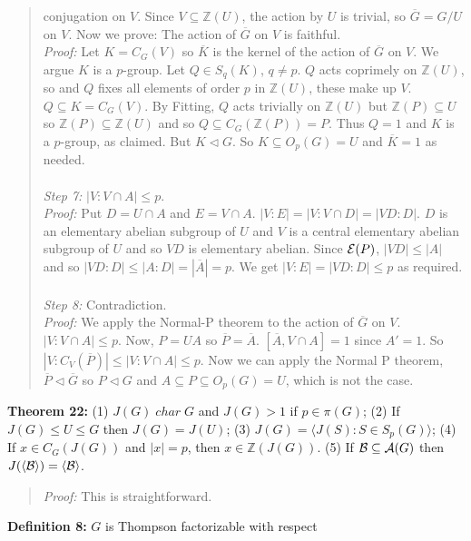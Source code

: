 \begin{quote}
conjugation on $V$.  Since $V \subseteq {\mathbb Z} (U)$, the action by $U$ is trivial, so ${\overline G} = G/U$ on $V$.
Now we prove:
The action of ${\overline G}$ on $V$ is faithful. \\
\emph{Proof:}  
Let $K = C_G(V)$ so ${\overline K}$ is the kernel of the action of ${\overline G}$ on $V$.
We argue $K$ is a $p$-group.
Let $Q \in S_q(K)$, $q \ne p$.  $Q$ acts coprimely on ${\mathbb Z}(U)$, so
and $Q$ fixes all elements of order $p$ in ${\mathbb Z}(U)$, these make up $V$. 
$Q \subseteq K =C_G(V)$.   By Fitting, $Q$ acts trivially on ${\mathbb Z}(U)$ but
${\mathbb Z}(P) \subseteq U$ so ${\mathbb Z}(P) \subseteq {\mathbb Z}(U)$ and so $Q \subseteq C_G({\mathbb Z}(P)) = P$.
Thus $Q = 1$ and $K$ is a $p$-group, as claimed.   But $K \lhd G$.  So $K \subseteq O_p(G)=U$ and ${\overline K} = 1$ as needed.
\\
\\
\emph{Step 7:} $|V: V \cap A| \leq p$.\\
\emph{Proof:}  Put $D = U \cap A$ and $E = V \cap A$.  $|V:E| = |V:V \cap D| = |VD:D|$.  $D$ is an elementary abelian
subgroup of $U$ and $V$ is a central elementary abelian subgroup of $U$ and so $VD$ is elementary abelian.
Since ${\cal E}(P)$, $|VD| \leq |A|$ and so $|VD:D| \leq |A:D| = |{\overline A}| = p$.  We get $|V:E|= |VD:D| \leq p$
as required.
\\
\\
\emph{Step 8:} Contradiction. \\
\emph{Proof:}
We apply the Normal-P theorem to the action of ${\overline G}$ on $V$.
$|V: V \cap A| \leq p$. Now, $P=UA$ so ${\overline P} = {\overline A}$.
$[{\overline A}, V \cap A] = 1$ since $A' = 1$.  
So $|V:C_V({\overline P})| \leq | V: V \cap A| \leq p$.  Now we can apply the Normal P theorem,
${\overline P} \lhd {\overline G}$ so $P \lhd G$ and $A \subseteq P \subseteq O_p(G)=U$, which is not
the case.
\end{quote}
{\bf Theorem 22:} 
(1) $J(G) \; char \; G$ and $J(G) > 1$ if $p \in \pi(G)$;
(2) If $J(G) \le U \le G$ then $J(G) = J(U)$; 
(3) $J(G)= \langle J(S): S \in S_p(G) \rangle $;
(4) If $x \in C_G(J(G))$ and $|x|=p$, then $x \in {\mathbb Z}(J(G))$.
(5) If ${\cal B} \subseteq {\cal A}(G)$ then 
$J( \langle {\cal B} \rangle) =  \langle {\cal B} \rangle $.\\
\begin{quote}
\emph{Proof:}   This is straightforward.
\end{quote}
{\bf Definition 8:}
$G$ is Thompson factorizable
with respect
